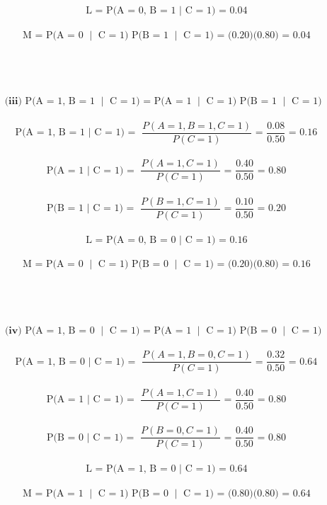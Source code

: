 \documentclass[11pt]{article}
\begin{document}
\[\text{ L = P(A = 0, B = 1 $\mid$ C = 1) = 0.04}\]\\
\[\text{ M = P(A = 0 $\mid$ C = 1) P(B = 1 $\mid$ C = 1) = (0.20)(0.80) = 0.04}\]\\
\\
\\
\vspace*{1.2cm}\\
\[\textbf{(iii) } \text{P(A = 1, B = 1 $\mid$ C = 1) = P(A = 1 $\mid$ C = 1) P(B = 1 $\mid$ C = 1) }\]\\
\[\text{P(A = 1, B = 1 $\mid$ C = 1) = } \frac{P(A = 1, B = 1, C=1)}{P(C = 1)} \text{ = } \frac{0.08}{0.50} \text{ = 0.16}\]\\
\[\text{P(A = 1 $\mid$ C = 1) = } \frac{P(A = 1, C=1)}{P(C = 1)} \text{ = } \frac{0.40}{0.50} \text{ = 0.80}\]\\
\[\text{P(B = 1 $\mid$ C = 1) = } \frac{P(B = 1, C=1)}{P(C = 1)} \text{ = } \frac{0.10}{0.50} \text{ = 0.20}\]\\
\[\text{ L = P(A = 0, B = 0 $\mid$ C = 1) = 0.16}\]\\
\[\text{ M = P(A = 0 $\mid$ C = 1) P(B = 0 $\mid$ C = 1) = (0.20)(0.80) = 0.16}\]\\
\\
\\
\vspace*{1.2cm}\\
\[\textbf{(iv) } \text{P(A = 1, B = 0 $\mid$ C = 1) = P(A = 1 $\mid$ C = 1) P(B = 0 $\mid$ C = 1) }\]\\
\[\text{P(A = 1, B = 0 $\mid$ C = 1) = } \frac{P(A = 1, B = 0, C=1)}{P(C = 1)} \text{ = } \frac{0.32}{0.50} \text{ = 0.64}\]\\
\[\text{P(A = 1 $\mid$ C = 1) = } \frac{P(A = 1, C=1)}{P(C = 1)} \text{ = } \frac{0.40}{0.50} \text{ = 0.80}\]\\
\[\text{P(B = 0 $\mid$ C = 1) = } \frac{P(B = 0, C=1)}{P(C = 1)} \text{ = } \frac{0.40}{0.50} \text{ = 0.80}\]\\
\[\text{ L = P(A = 1, B = 0 $\mid$ C = 1) = 0.64}\]\\
\[\text{ M = P(A = 1 $\mid$ C = 1) P(B = 0 $\mid$ C = 1) = (0.80)(0.80) = 0.64}\]\\
\\
\\
\vspace*{0.4cm}\\
\\
\\
\end{document}
